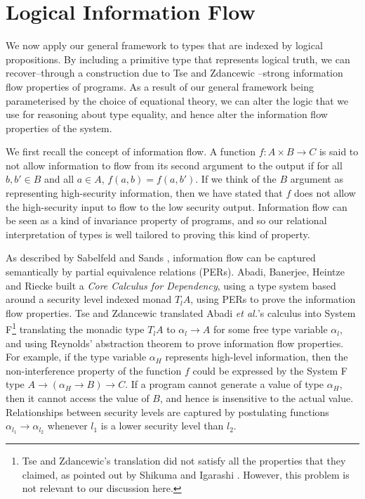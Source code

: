 \section{Logical Information Flow}
\label{sec:information-flow}

\newcommand{\infoflow}{\mathit{Log}}

We now apply our general framework to types that are indexed by
logical propositions. By including a primitive type that represents
logical truth, we can recover--through a construction due to Tse and
Zdancewic \cite{tse04translating}--strong information flow properties
of programs. As a result of our general framework being parameterised
by the choice of equational theory, we can alter the logic that we use
for reasoning about type equality, and hence alter the information
flow properties of the system. 

We first recall the concept of information flow. A function $f : A
\times B \to C$ is said to not allow information to flow from its
second argument to the output if for all $b,b' \in B$ and all $a \in
A$, $f(a,b) = f(a,b')$. If we think of the $B$ argument as
representing high-security information, then we have stated that $f$
does not allow the high-security input to flow to the low security
output. Information flow can be seen as a kind of invariance property
of programs, and so our relational interpretation of types is well
tailored to proving this kind of property.

As described by Sabelfeld and Sands \cite{sabelfeld01per}, information
flow can be captured semantically by partial equivalence relations
(PERs). Abadi, Banerjee, Heintze and Riecke \cite{abadi99core} built a
\emph{Core Calculus for Dependency}, using a type system based around
a security level indexed monad $T_lA$, using PERs to prove the
information flow properties. Tse and Zdancewic \cite{tse04translating}
translated Abadi \emph{et al.}'s calculus into System F\footnote{Tse
  and Zdancewic's translation did not satisfy all the properties that
  they claimed, as pointed out by Shikuma and Igarashi
  \cite{shikuma08proving}. However, this problem is not relevant to
  our discussion here.} translating the monadic type $T_lA$ to
$\alpha_l \to A$ for some free type variable $\alpha_l$, and using
Reynolds' abstraction theorem to prove information flow
properties. For example, if the type variable $\alpha_H$ represents
high-level information, then the non-interference property of the
function $f$ could be expressed by the System F type $A \to (\alpha_H
\to B) \to C$. If a program cannot generate a value of type
$\alpha_H$, then it cannot access the value of $B$, and hence is
insensitive to the actual value. Relationships between security levels
are captured by postulating functions $\alpha_{l_1} \to \alpha_{l_2}$
whenever $l_1$ is a lower security level than $l_2$.


